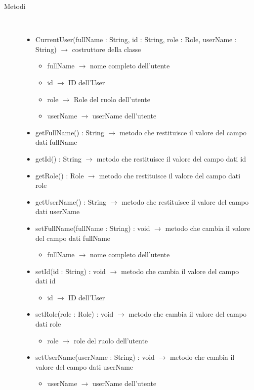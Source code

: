 \begin{description}
\item[Metodi] \hfill \\
\vspace{-7mm}
\begin{itemize}
	\item CurrentUser(fullName : String, id : String, role : Role, userName : String) $\rightarrow$ costruttore della classe\begin{itemize}
		\item fullName $\rightarrow$ nome completo dell'utente
		\item id $\rightarrow$ ID dell'User
		\item role $\rightarrow$ Role del ruolo dell'utente
		\item userName $\rightarrow$ userName dell'utente
	\end{itemize}
	
	\item getFullName() : String $\rightarrow$ metodo che restituisce il valore del campo dati fullName
	\item getId() : String $\rightarrow$ metodo che restituisce il valore del campo dati id
	\item getRole() : Role $\rightarrow$ metodo che restituisce il valore del campo dati role
	\item getUserName() : String $\rightarrow$ metodo che restituisce il valore del campo dati userName
	\item setFullName(fullName : String) : void $\rightarrow$ metodo che cambia il valore del campo dati fullName\begin{itemize}
		\item fullName $\rightarrow$ nome completo dell'utente	
	\end{itemize}
	
	\item setId(id : String) : void $\rightarrow$ metodo che cambia il valore del campo dati id\begin{itemize}
		\item id $\rightarrow$ ID dell'User
	\end{itemize}
	
	\item setRole(role : Role) : void $\rightarrow$ metodo che cambia il valore del campo dati role\begin{itemize}
		\item role $\rightarrow$ role del ruolo dell'utente
	\end{itemize}
	
	\item setUserName(userName : String) : void $\rightarrow$ metodo che cambia il valore del campo dati userName\begin{itemize}
		\item userName $\rightarrow$ userName dell'utente
	\end{itemize}
	
\end{itemize}

\end{description}

